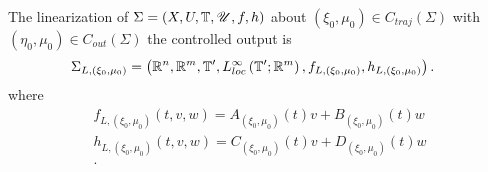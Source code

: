 \begin{definition}
	The linearization of $\Sigma = \left( X, U, \mathbb{T} , \mathscr{U} , f, h \right) $ about $\left( \xi_0, \mu_0 \right) \in  C_{traj}\left( \Sigma \right) $ with $\left( \eta_0, \mu_0 \right) \in C_{out}\left( \Sigma \right) $ the controlled output is 
	\begin{align*}
		\Sigma _{L, \left( \xi_0, \mu_0 \right) }&= \left( \mathbb{R}^{n}, \mathbb{R}^{m}, \mathbb{T} ', L^{\infty}_{loc}\left( \mathbb{T} ' ; \mathbb{R}^{m} \right) , f_{L, \left( \xi_0, \mu_0 \right) }, h_{L, \left( \xi_0, \mu_0 \right) } \right) 
	.\end{align*}
	where 
	\begin{align*}
		f_{L, \left( \xi_0, \mu_0 \right) }\left( t, v, w \right) = A_{\left( \xi_0, \mu_0 \right) }\left( t \right) v + B_{\left(\xi_0, \mu_0\right)}\left( t \right) w \\
		h_{L, \left( \xi_0, \mu_0 \right) }\left( t, v, w \right) = C_{\left( \xi_0, \mu_0 \right) }\left( t \right) v + D_{\left(\xi_0, \mu_0\right)}\left( t \right) w \\
	.\end{align*}
\end{definition}
